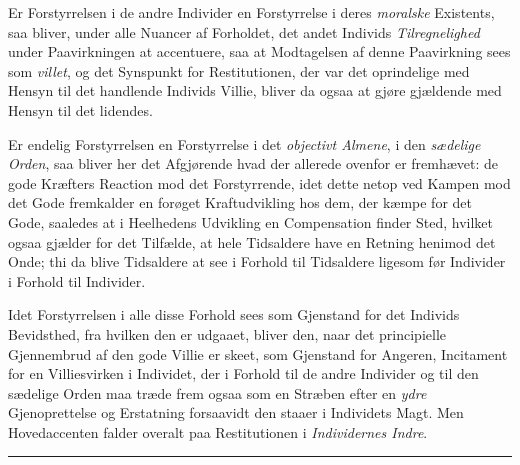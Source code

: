 Er Forstyrrelsen i de andre Individer en Forstyrrelse i deres \emph{moralske}
Existents, saa bliver, under alle Nuancer af Forholdet, det andet Individs
\emph{Tilregnelighed} under Paavirkningen at accentuere, saa at Modtagelsen af
denne Paavirkning sees som \emph{villet}, og det Synspunkt for Restitutionen, der
var det oprindelige med Hensyn til det handlende Individs Villie, bliver da ogsaa
at gjøre gjældende med Hensyn til det lidendes.

Er endelig Forstyrrelsen en Forstyrrelse i det \emph{objectivt Almene}, i den
\emph{sædelige Orden}, saa bliver her det Afgjørende hvad der allerede ovenfor er
fremhævet: de gode Kræfters Reaction mod det Forstyrrende, idet dette netop ved
Kampen mod det Gode fremkalder en forøget Kraftudvikling hos dem, der kæmpe for
det Gode, saaledes at i Heelhedens Udvikling en Compensation finder Sted, hvilket
ogsaa gjælder for det Tilfælde, at hele Tidsaldere have en Retning henimod det
Onde; thi da blive Tidsaldere at see i Forhold til Tidsaldere ligesom før
Individer i Forhold til Individer.

Idet Forstyrrelsen i alle disse Forhold sees som Gjenstand for det Individs
Bevidsthed, fra hvilken den er udgaaet, bliver den, naar det principielle
Gjennembrud af den
 gode Villie er skeet, som Gjenstand for Angeren, Incitament for en Villiesvirken
i Individet, der i Forhold til de andre Individer og til den sædelige Orden maa
træde frem ogsaa som en Stræben efter en \emph{ydre} Gjenoprettelse og Erstatning
forsaavidt den staaer i Individets Magt. Men Hovedaccenten falder overalt paa
Restitutionen i \emph{Individernes Indre}.

\begin{center}\rule{2cm}{0.4pt}\end{center}

